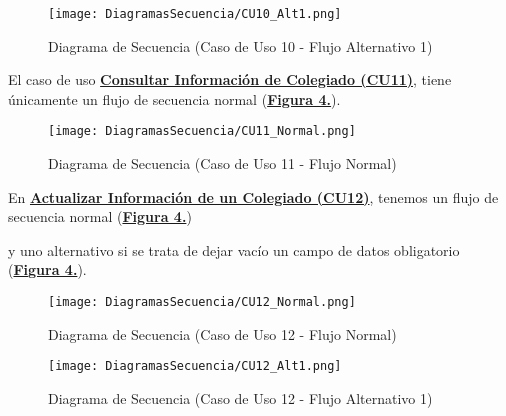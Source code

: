 \begin{landscape}
  \label{fig:Secuencia_CU10_Alt1}
  \vspace*{\fill}
  \begin{figure}[!htbp]
    \centering
    \texttt{[image: DiagramasSecuencia/CU10\_Alt1.png]}
    \caption{Diagrama de Secuencia (Caso de Uso 10 - Flujo Alternativo 1)}
  \end{figure}
  \vfill
\end{landscape}
\FloatBarrier

\addtocounter{figura_cap4}{1}
El caso de uso \textbf{\hyperref[tab:curConsultaInfoColeg]{Consultar Información de Colegiado (CU11)}}, tiene únicamente un flujo de secuencia normal (\textbf{\hyperref[fig:Secuencia_CU11_Normal]{Figura 4.}}).
\begin{figure}[!htbp]
  \centering
  \texttt{[image: DiagramasSecuencia/CU11\_Normal.png]}
  \caption{Diagrama de Secuencia (Caso de Uso 11 - Flujo Normal)}
  \label{fig:Secuencia_CU11_Normal}
\end{figure}
\FloatBarrier

\addtocounter{figura_cap4}{1}
En \textbf{\hyperref[tab:curActualizarColeg]{Actualizar Información de un Colegiado (CU12)}}, tenemos un flujo de secuencia normal (\textbf{\hyperref[fig:Secuencia_CU12_Normal]{Figura 4.}}) \addtocounter{figura_cap4}{1} y uno alternativo si se trata de dejar vacío un campo de datos obligatorio (\textbf{\hyperref[fig:Secuencia_CU12_Alt1]{Figura 4.}}).
\begin{landscape}
  \label{fig:Secuencia_CU12_Normal}
  \vspace*{\fill}
  \begin{figure}[!htbp]
    \centering
    \texttt{[image: DiagramasSecuencia/CU12\_Normal.png]}
    \caption{Diagrama de Secuencia (Caso de Uso 12 - Flujo Normal)}
  \end{figure}
  \vfill
\end{landscape}
\FloatBarrier

\begin{landscape}
  \label{fig:Secuencia_CU12_Alt1}
  \vspace*{\fill}
  \begin{figure}[!htbp]
    \centering
    \texttt{[image: DiagramasSecuencia/CU12\_Alt1.png]}
    \caption{Diagrama de Secuencia (Caso de Uso 12 - Flujo Alternativo 1)}
  \end{figure}
  \vfill
\end{landscape}
\FloatBarrier

